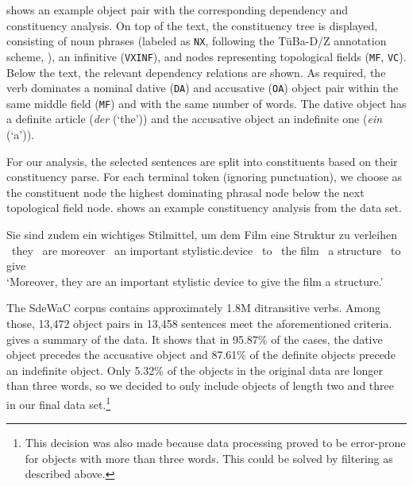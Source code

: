 \documentclass[output=paper,colorlinks,citecolor=brown]{langscibook}
\begin{document}
 shows an example object pair with the corresponding dependency and constituency analysis. On top of the text, the constituency tree is displayed, consisting of noun phrases (labeled as \texttt{NX}, following the TüBa-D/Z annotation scheme, \cite{telljohann-et-al17}), an infinitive (\texttt{VXINF}), and nodes representing topological fields (\texttt{MF}, \texttt{VC}). Below the text, the relevant dependency relations are shown. As required, the verb dominates a nominal dative (\texttt{DA}) and accusative (\texttt{OA}) object pair within the same middle field (\texttt{MF}) and with the same number of words. The dative object has a definite article (\textit{der} (`the')) and the accusative object an indefinite one (\textit{ein} (`a')).

For our analysis, the selected sentences are split into constituents based on their constituency parse. For each terminal token (ignoring punctuation), we choose as the constituent node the highest dominating phrasal node below the next topological field node.  shows an example constituency analysis from the data set.

\ea\label{ex:phrases}
 \gll \up{[}Sie\up{]\subtt{NX}} \up{[}sind\up{]\subtt{VXFIN}} \up{[}zudem\up{]\subtt{PX}} \up{[}ein wichtiges Stilmittel\up{]\subtt{NX}}, \up{[}um\up{]\subtt{C}} \up{[}dem Film\up{]\subtt{NX}} \up{[}eine Struktur\up{]\subtt{NX}} \up{[}zu verleihen\up{]\subtt{VXINF}}\\
  {\ they}  {\ are} moreover  {\ an} important stylistic.device {\ to}  {\ the} film  {\ a} structure  {\ to} give\\
 \glt `Moreover, they are an important stylistic device to give the film a structure.'
\z

The SdeWaC corpus contains approximately 1.8M ditransitive verbs. Among those, 13,472 object pairs in 13,458 sentences meet the aforementioned criteria.  gives a summary of the data. It shows that in 95.87\% of the cases, the dative object precedes the accusative object and 87.61\% of the definite objects precede an indefinite object. Only 5.32\% of the objects in the original data are longer than three words, so we decided to only include objects of length two and three in our final data set.\footnote{This decision was also made because data processing proved to be error-prone for objects with more than three words. This could be solved by filtering as described above.}
\end{document}
